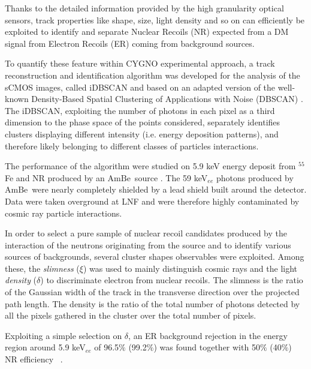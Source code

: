 \documentclass[physics,article,submit,moreauthors,pdftex]{Definitions/mdpi}
\newcommand{\ambe}{\ensuremath{\textrm{Am} \textrm{Be}}\xspace}
\begin{document}
Thanks to the detailed information provided by the high granularity optical sensors, track properties like shape, size, light density and so on can efficiently be exploited to identify and separate Nuclear Recoils (NR) expected from a DM signal from Electron Recoils (ER) coming from background sources.

To quantify these feature within CYGNO experimental approach, a track reconstruction and identification algorithm was developed for the analysis of the sCMOS images, called iDBSCAN \cite{Baracchini:2020iwg} and based on an adapted version of the well-known Density-Based Spatial Clustering of Applications with Noise (DBSCAN) \cite{dbscan1996}. The iDBSCAN, exploiting the number of photons in each pixel as a third dimension to the phase space of the points considered, separately identifies clusters displaying different intensity (i.e. energy deposition patterns), and therefore likely belonging to different classes of particles interactions.

The performance of the algorithm were studied on 5.9 keV energy deposit from $^{55}$Fe and NR  produced by an \ambe~source \cite{bib:coronello}. The 59 keV$_{ee}$ photons produced by \ambe~were nearly completely shielded by a lead shield built around the detector. Data were taken overground at LNF and were therefore highly contaminated by cosmic ray particle interactions.


In order to  select a pure sample of nuclear recoil candidates produced by the interaction of the neutrons
originating from the source and to identify various sources of backgrounds, several cluster shapes observables were exploited. Among these, the \emph{slimness} ($\xi$) was used to mainly distinguish cosmic rays  and the light \emph{density} ($\delta$) to discriminate electron from nuclear recoils. The slimness is the ratio of the Gaussian width of the track in the transverse direction over the projected path length. The density is the ratio of the total number of photons detected by all the pixels gathered in the cluster over the total number of pixels. 

Exploiting a simple selection on $\delta$,  an ER background rejection in the energy region around 5.9 keV$_{ee}$ of 96.5$\%$ (99.2$\%$) was found together with  50$\%$ (40$\%$) NR efficiency ~\cite{bib:coronello}.


\end{document}
